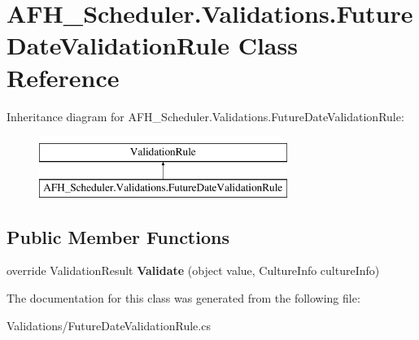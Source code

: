 \section{A\+F\+H\+\_\+\+Scheduler.\+Validations.\+Future\+Date\+Validation\+Rule Class Reference}
\label{class_a_f_h___scheduler_1_1_validations_1_1_future_date_validation_rule}
Inheritance diagram for A\+F\+H\+\_\+\+Scheduler.\+Validations.\+Future\+Date\+Validation\+Rule\+:\begin{figure}[H]
\begin{center}
\leavevmode
\includegraphics[height=2.000000cm]{class_a_f_h___scheduler_1_1_validations_1_1_future_date_validation_rule}
\end{center}
\end{figure}
\subsection*{Public Member Functions}
\begin{DoxyCompactItemize}
\item 
\mbox{\label{class_a_f_h___scheduler_1_1_validations_1_1_future_date_validation_rule_acd5e2d4d219317c88b1c813de666dfe4}} 
override Validation\+Result {\bfseries Validate} (object value, Culture\+Info culture\+Info)
\end{DoxyCompactItemize}


The documentation for this class was generated from the following file\+:\begin{DoxyCompactItemize}
\item 
Validations/Future\+Date\+Validation\+Rule.\+cs\end{DoxyCompactItemize}
